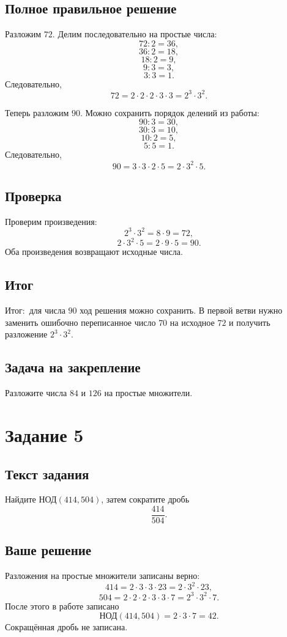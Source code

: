 \documentclass[12pt,a4paper]{article}
\newcommand{\Outcome}{\textcolor{teal!60!black}{Итог:}}
\begin{document}
\subsection*{Полное правильное решение}
Разложим $72$. Делим последовательно на простые числа:
\[
72:2=36,
\]
\[
36:2=18,
\]
\[
18:2=9,
\]
\[
9:3=3,
\]
\[
3:3=1.
\]
Следовательно,
\[
72=2\cdot2\cdot2\cdot3\cdot3=2^3\cdot3^2.
\]

Теперь разложим $90$. Можно сохранить порядок делений из работы:
\[
90:3=30,
\]
\[
30:3=10,
\]
\[
10:2=5,
\]
\[
5:5=1.
\]
Следовательно,
\[
90=3\cdot3\cdot2\cdot5=2\cdot3^2\cdot5.
\]

\subsection*{Проверка}
Проверим произведения:
\[
2^3\cdot3^2=8\cdot9=72,
\]
\[
2\cdot3^2\cdot5=2\cdot9\cdot5=90.
\]
Оба произведения возвращают исходные числа.

\subsection*{Итог}
\Outcome\ для числа $90$ ход решения можно сохранить. В первой ветви нужно заменить ошибочно переписанное число $70$ на исходное $72$ и получить разложение $2^3\cdot3^2$.

\subsection*{Задача на закрепление}
Разложите числа $84$ и $126$ на простые множители.

\newpage
{}\label{task:5}
\section*{Задание 5}

\subsection*{Текст задания}
Найдите $\text{НОД}(414,504)$, затем сократите дробь
\[
\frac{414}{504}.
\]

\subsection*{Ваше решение}
Разложения на простые множители записаны верно:
\[
414=2\cdot3\cdot3\cdot23=2\cdot3^2\cdot23,
\]
\[
504=2\cdot2\cdot2\cdot3\cdot3\cdot7=2^3\cdot3^2\cdot7.
\]
После этого в работе записано
\[
\text{НОД}(414,504)=2\cdot3\cdot7=42.
\]
Сокращённая дробь не записана.
\end{document}
